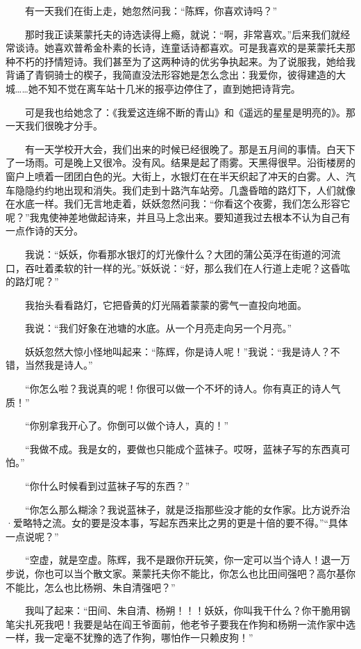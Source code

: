  　　有一天我们在街上走，她忽然问我：“陈辉，你喜欢诗吗？” 
 
 　　那时我正读莱蒙托夫的诗选读得上瘾，就说：“啊，非常喜欢。”后来我们就经常谈诗。她喜欢普希金朴素的长诗，连童话诗都喜欢。可是我喜欢的是莱蒙托夫那种不朽的抒情短诗。我们甚至为了这两种诗的优劣争执起来。为了说服我，她给我背诵了青铜骑士的楔子，我简直没法形容她是怎么念出：我爱你，彼得建造的大城……她不知不觉在离车站十几米的报亭边停住了，直到她把诗背完。 
 
 　　可是我也给她念了：《我爱这连绵不断的青山》和《遥远的星星是明亮的》。那一天我们很晚才分手。 
 
 　　有一天学校开大会，我们出来的时候已经很晚了。那是五月间的事情。白天下了一场雨。可是晚上又很冷。没有风。结果是起了雨雾。天黑得很早。沿街楼房的窗户上喷着一团团白色的光。大街上，水银灯在在半天织起了冲天的白雾。人、汽车隐隐约约地出现和消失。我们走到十路汽车站旁。几盏昏暗的路灯下，人们就像在水底一样。我们无言地走着，妖妖忽然问我：“你看这个夜雾，我们怎么形容它呢？”我鬼使神差地做起诗来，并且马上念出来。要知道我过去根本不认为自己有一点作诗的天分。 
 
 　　我说：“妖妖，你看那水银灯的灯光像什么？大团的蒲公英浮在街道的河流口，吞吐着柔软的针一样的光。”妖妖说：“好，那么我们在人行道上走呢？这昏吰的路灯呢？” 
 
 　　我抬头看看路灯，它把昏黄的灯光隔着蒙蒙的雾气一直投向地面。 
 
 　　我说：“我们好象在池塘的水底。从一个月亮走向另一个月亮。” 
 
 　　妖妖忽然大惊小怪地叫起来：“陈辉，你是诗人呢！”我说：“我是诗人？不错，当然我是诗人。” 
 
 　　“你怎么啦？我说真的呢！你很可以做一个不坏的诗人。你有真正的诗人气质！” 
 
 　　“你别拿我开心了。你倒可以做个诗人，真的！” 
 
 　　“我做不成。我是女的，要做也只能成个蓝袜子。哎呀，蓝袜子写的东西真可怕。” 
 
 　　“你什么时候看到过蓝袜子写的东西？” 
 
 　　“你怎么那么糊涂？我说蓝袜子，就是泛指那些没才能的女作家。比方说乔治·爱略特之流。女的要是没本事，写起东西来比之男的更是十倍的要不得。”“具体一点说呢？” 
 
 　　“空虚，就是空虚。陈辉，我不是跟你开玩笑，你一定可以当个诗人！退一万步说，你也可以当个散文家。莱蒙托夫你不能比，你怎么也比田间强吧？高尔基你不能比，怎么也比杨朔、朱自清强吧？” 
 
 　　我叫了起来：“田间、朱自清、杨朔！！！妖妖，你叫我干什么？你干脆用钢笔尖扎死我吧！我要是站在阎王爷面前，他老爷子要我在作狗和杨朔一流作家中选一样，我一定毫不犹豫的选了作狗，哪怕作一只赖皮狗！” 
 
